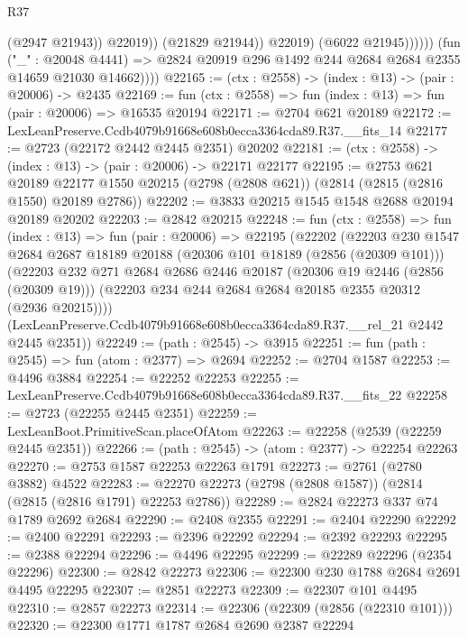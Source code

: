 \begin{lexlean}{R37}
\begin{coremodule}
                              (@2947 @21943))
                            @22019))
                        (@21829 @21944))
                      @22019)
                    (@6022 @21945))))))
          (fun ("_" : @20048 @4441) =>
          @2824 @20919 @296 @1492 @244 @2684 @2684 @2355 @14659 @21030 @14662))))
@22165 := (ctx : @2558) -> (index : @13) -> (pair : @20006) -> @2435
@22169 := fun (ctx : @2558) => fun (index : @13) => fun (pair : @20006) => @16535 @20194
@22171 := @2704 @621 @20189
@22172 := LexLeanPreserve.Ccdb4079b91668e608b0ecca3364cda89.R37.__fits_14
@22177 := @2723 (@22172 @2442 @2445 @2351) @20202
@22181 := (ctx : @2558) -> (index : @13) -> (pair : @20006) -> @22171 @22177
@22195 := @2753
    @621
    @20189
    @22177
    @1550
    @20215
    (@2798 (@2808 @621))
    (@2814 (@2815 (@2816 @1550) @20189 @2786))
@22202 := @3833 @20215 @1545 @1548 @2688 @20194 @20189 @20202
@22203 := @2842 @20215
@22248 := fun (ctx : @2558) =>
  fun (index : @13) =>
  fun (pair : @20006) =>
  @22195
    (@22202
      (@22203
        @230
        @1547
        @2684
        @2687
        @18189
        @20188
        (@20306 @101 @18189 (@2856 (@20309 @101)))
        (@22203
          @232
          @271
          @2684
          @2686
          @2446
          @20187
          (@20306 @19 @2446 (@2856 (@20309 @19)))
          (@22203 @234 @244 @2684 @2684 @20185 @2355 @20312 (@2936 @20215))))
      (LexLeanPreserve.Ccdb4079b91668e608b0ecca3364cda89.R37.__rel_21 @2442 @2445 @2351))
@22249 := (path : @2545) -> @3915
@22251 := fun (path : @2545) => fun (atom : @2377) => @2694
@22252 := @2704 @1587
@22253 := @4496 @3884
@22254 := @22252 @22253
@22255 := LexLeanPreserve.Ccdb4079b91668e608b0ecca3364cda89.R37.__fits_22
@22258 := @2723 (@22255 @2445 @2351)
@22259 := LexLeanBoot.PrimitiveScan.placeOfAtom
@22263 := @22258 (@2539 (@22259 @2445 @2351))
@22266 := (path : @2545) -> (atom : @2377) -> @22254 @22263
@22270 := @2753 @1587 @22253 @22263 @1791
@22273 := @2761 (@2780 @3882) @4522
@22283 := @22270 @22273 (@2798 (@2808 @1587)) (@2814 (@2815 (@2816 @1791) @22253 @2786))
@22289 := @2824 @22273 @337 @74 @1789 @2692 @2684
@22290 := @2408 @2355
@22291 := @2404 @22290
@22292 := @2400 @22291
@22293 := @2396 @22292
@22294 := @2392 @22293
@22295 := @2388 @22294
@22296 := @4496 @22295
@22299 := @22289 @22296 (@2354 @22296)
@22300 := @2842 @22273
@22306 := @22300 @230 @1788 @2684 @2691 @4495 @22295
@22307 := @2851 @22273
@22309 := @22307 @101 @4495
@22310 := @2857 @22273
@22314 := @22306 (@22309 (@2856 (@22310 @101)))
@22320 := @22300 @1771 @1787 @2684 @2690 @2387 @22294

\end{coremodule}
\end{lexlean}
